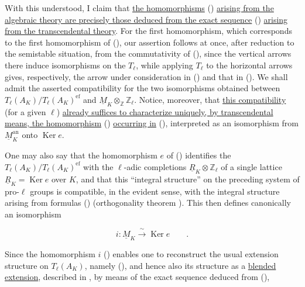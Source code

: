 \noindent
With this understood, I claim that \underline{the homomorphisms}
() \underline{arising from the algebraic theory are precisely
those deduced from the exact sequence} () \underline{arising
from the transcendental theory}.  For the first homomorphism, which
corresponds to the first homomorphism of (), our assertion follows
at once, after reduction to the semistable situation, from the
commutativity of (), since the vertical arrows there induce
isomorphisms on the $T_\ell$, while applying $T_\ell$ to the horizontal
arrows gives, respectively, the arrow under consideration in ()
and that in ().  We shall admit the asserted compatibility for
the two isomorphisms obtained between
$T_\ell(A_K)/T_\ell(A_K)^{\mathrm{ef}}$ and
$\underline M_K\otimes_{\mathbb Z}\mathbb Z_\ell$.  Notice, moreover,
that \underline{this compatibility} (for a given $\ell$)
\underline{already suffices to characterize uniquely, by
transcendental means, the homomorphism} () \underline{occurring
in} (), interpreted as an isomorphism from
$\underline M_K^{\mathrm{an}}$ onto $\operatorname{Ker}e$.

One may also say that the homomorphism $e$ of () identifies the
$T_\ell(A_K)/T_\ell(A_K)^{\mathrm{ef}}$ with the $\ell$-adic
completions $\underline R_K\otimes\mathbb Z_\ell$ of a single lattice
$\underline R_K=\operatorname{Ker}e$ over $K$, and that this
``integral structure'' on the preceding system of pro-$\ell$ groups is
compatible, in the evident sense, with the integral structure arising
from formulas () (orthogonality theorem ).  This then defines
canonically an isomorphism

\begin{equation*}
 i:\underline M_K\xrightarrow{\ \sim\ }\operatorname{Ker}e
 \qquad .
\end{equation*}

Since the homomorphism $i$ () enables one to reconstruct the
usual extension structure on $T_\ell(A_K)$, namely (), and hence
also its structure as a \underline{blended extension}, described in
, by means of the exact sequence deduced from (),

